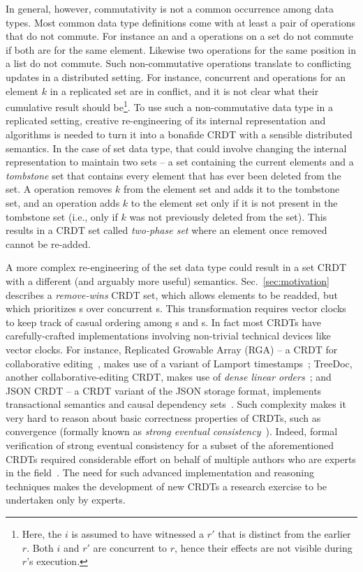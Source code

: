 In general, however, commutativity is not a common occurrence among data
types. Most common data type definitions come with at least a pair of
operations that do not commute. For instance an  and a 
operations on a set do not commute if both are for the same element.
Likewise two  operations for the same position in a list do not
commute. Such non-commutative operations translate to conflicting updates
in a distributed setting. For instance, concurrent  and
 operations for an element $k$ in a replicated set are in
conflict, and it is not clear what their cumulative result should
be\footnote{Here, the  $i$ is assumed to have witnessed a
   $r'$ that is distinct from the earlier  $r$. Both
  $i$ and $r'$ are concurrent to $r$, hence their effects are not visible
  during $r$'s execution.}. To use such a non-commutative data type in a
replicated setting, creative re-engineering of its internal representation
and algorithms is needed to turn it into a bonafide CRDT with a sensible
distributed semantics. In the case of set data type, that could involve
changing the internal representation to maintain two sets -- a set
containing the current elements and a \emph{tombstone} set that contains
every element that has ever been deleted from the set. A  operation removes $k$ from the element set and adds it to the
tombstone set, and an  operation adds $k$ to the element set
only if it is not present in the tombstone set (i.e., only if $k$ was not
previously deleted from the set). This results in a CRDT set called
\emph{two-phase set} where an element once removed cannot be re-added. 

A more complex re-engineering of the set data type could result in a set
CRDT with a different (and arguably more useful) semantics.
Sec.~\ref{sec:motivation} describes a \emph{remove-wins} CRDT set, which
allows elements to be readded, but which prioritizes s over
concurrent s. This transformation requires vector
clocks~\cite{vectorclock} to keep track of casual ordering among
s and s. In fact most CRDTs have carefully-crafted
implementations involving non-trivial technical devices like vector
clocks. For instance, Replicated Growable Array (RGA) -- a CRDT for
collaborative editing~\cite{rga}, makes use of a variant of Lamport
timestamps~\cite{lamportts}; TreeDoc, another collaborative-editing CRDT,
makes use of \emph{dense linear orders}~\cite{treedoc}; and JSON CRDT -- a
CRDT variant of the JSON storage format, implements transactional semantics
and causal dependency sets~\cite{jsoncrdt}. Such complexity makes it very
hard to reason about basic correctness properties of CRDTs, such as
convergence (formally known as \emph{strong eventual
consistency}~\cite{crdts}).  Indeed, formal verification of strong eventual
consistency for a subset of the aforementioned CRDTs required considerable
effort on behalf of multiple authors who are experts in the
field~\cite{kleppmann2017}. The need for such advanced implementation and
reasoning techniques makes the development of new CRDTs a research exercise
to be undertaken only by experts.

